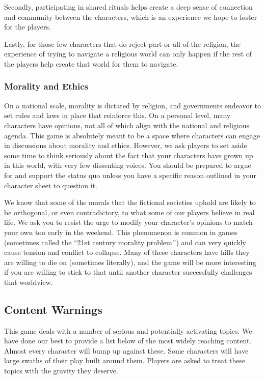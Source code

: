 \documentclass[sheet]{GL2020}
\begin{document}
Secondly, participating in shared rituals helps create a deep sense of connection and community between the characters, which is an experience we hope to foster for the players. 

Lastly, for those few characters that do reject part or all of the religion, the experience of trying to navigate a religious world can only happen if the rest of the players help create that world for them to navigate.

\subsubsection{Morality and Ethics}
On a national scale, morality is dictated by religion, and governments endeavor to set rules and laws in place that reinforce this. On a personal level, many characters have opinions, not all of which align with the national and religious agenda. This game is absolutely meant to be a space where characters can engage in discussions about morality and ethics. However, we ask players to set aside some time to think seriously about the fact that your characters have grown up in this world, with very few dissenting voices. You should be prepared to argue for and support the status quo unless you have a specific reason outlined in your character sheet to question it.

We know that some of the morals that the fictional societies uphold are likely to be orthogonal, or even contradictory, to what some of our players believe in real life. We ask you to resist the urge to modify your character’s opinions to match your own too early in the weekend. This phenomenon is common in games (sometimes called the ``21st century morality problem’’) and can very quickly cause tension and conflict to collapse. Many of these characters have hills they are willing to die on (sometimes literally), and the game will be more interesting if you are willing to stick to that until another character successfully challenges that worldview. 

\subsection{Content Warnings}
This game deals with a number of serious and potentially activating topics. We have done our best to provide a list below of the most widely reaching content. Almost every character will bump up against these. Some characters will have large swaths of their play built around them. Players are asked to treat these topics with the gravity they deserve.
\end{document}
